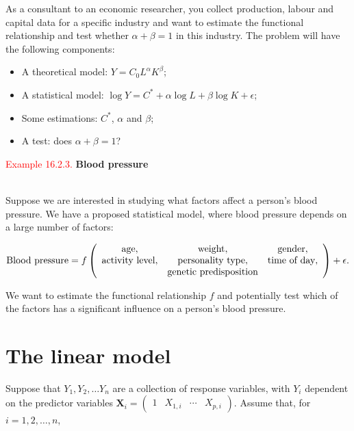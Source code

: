 \documentclass[
]{book}
\providecommand{\tightlist}{%
  \setlength{\itemsep}{0pt}\setlength{\parskip}{0pt}}
\begin{document}
As a consultant to an economic researcher, you collect production, labour and capital data for a specific industry and want to estimate the functional relationship and test whether \(\alpha + \beta = 1\) in this industry. The problem will have the following components:

\begin{itemize}
\tightlist
\item
  A theoretical model: \(Y = C_0 L^\alpha K^\beta\);\\
\item
  A statistical model: \(\log Y = C^\ast + \alpha \log L + \beta \log K + \epsilon\);\\
\item
  Some estimations: \(C^\ast\), \(\alpha\) and \(\beta\);\\
\item
  A test: does \(\alpha + \beta = 1\)?\\
\end{itemize}

\hfill\break

\leavevmode{}%
\textcolor{red}{Example 16.2.3.}
{\textbf{Blood pressure}}\\
\strut \\
Suppose we are interested in studying what factors affect a person's blood pressure. We have a proposed statistical model, where blood pressure depends on a large number of factors:

\[ \text{Blood pressure} = f \left( \begin{array}{c c c}  \text{age}, & \text{weight}, & \text{gender}, \\ \text{activity level}, & \text{personality type}, & \text{time of day}, \\ & \text{genetic predisposition} & \end{array} \right) + \epsilon. \]

We want to estimate the functional relationship \(f\) and potentially test which of the factors has a significant influence on a person's blood pressure.

\hypertarget{Sec_LinearI:linear}{%
\section{The linear model}\label{Sec_LinearI:linear}}

Suppose that \(Y_1, Y_2, \ldots Y_n\) are a collection of response variables, with \(Y_i\) dependent on the predictor variables \(\mathbf{X}_i = \begin{pmatrix} 1 & X_{1,i} & \cdots & X_{p,i} \end{pmatrix}\). Assume that, for \(i=1,2,\ldots, n\),\\
\end{document}
